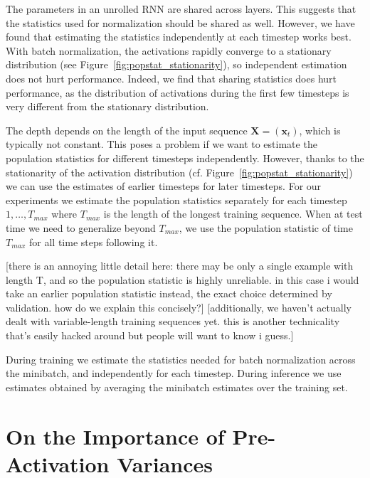 \documentclass{article} %
\newcommand{\vect}[1]{\mathbf{#1}}
\newcommand{\mat}[1]{\mathbf{#1}}
\begin{document}
The parameters in an unrolled RNN are shared across layers.
This suggests that the statistics used for normalization should be shared as well.
However, we have found that estimating the statistics independently at each timestep works best.
With batch normalization, the activations rapidly converge to a stationary distribution (see Figure~\ref{fig:popstat_stationarity}), so independent estimation does not hurt performance.
Indeed, we find that sharing statistics does hurt performance, as the distribution of activations during the first few timesteps is very different from the stationary distribution.

The depth depends on the length of the input sequence $\mat{X} = (\vect{x}_t)$, which is typically not constant.
This poses a problem if we want to estimate the population statistics for different timesteps independently.
However, thanks to the stationarity of the activation distribution (cf. Figure~\ref{fig:popstat_stationarity}) we can use the estimates of earlier timesteps for later timesteps.
For our experiments we estimate the population statistics separately for each timestep $1, \ldots, T_{max}$ where $T_{max}$ is the length of the longest training sequence.
When at test time we need to generalize beyond $T_{max}$, we use the population statistic of time $T_{max}$ for all time steps following it.

[there is an annoying little detail here: there may be only a single example with length T, and so the population statistic is highly unreliable. in this case i would take an earlier population statistic instead, the exact choice determined by validation. how do we explain this concisely?]
[additionally, we haven't actually dealt with variable-length training sequences yet. this is another technicality that's easily hacked around but people will want to know i guess.]



During training we estimate the statistics needed for batch normalization across the minibatch, and independently for each timestep.
During inference we use estimates obtained by averaging the minibatch estimates over the training set.







\section{On the Importance of Pre-Activation Variances}
\end{document}
